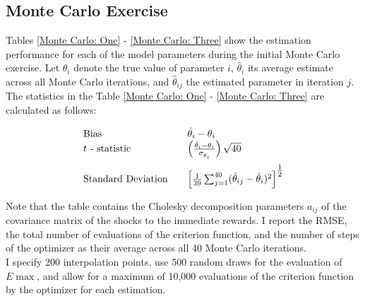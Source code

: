 \subsection{Monte Carlo Exercise}
Tables \ref{Monte Carlo: One} - \ref{Monte Carlo: Three} show the estimation performance for each of the model parameters during the initial Monte Carlo exercise. Let $\theta_i$ denote the true value of parameter $i$, $\hat{\theta}_i$ its average estimate across all Monte Carlo iterations, and $\hat{\theta}_{ij}$ the estimated parameter in iteration $j$. The statistics in the Table \ref{Monte Carlo: One} - \ref{Monte Carlo: Three} are calculated as follows:

\renewcommand\arraystretch{2}
\begin{align*}\begin{array}{l@{\qquad}l}
\text{Bias} & \hat{\theta}_i - \theta_i\\\medskip
\text{$t$ - statistic} & \left(\frac{\hat{\theta}_i - \theta_i}{\sigma_{\hat{\theta_i}}}\right) \sqrt{40} \\
\text{Standard Deviation} & \left[ \frac{1}{39} \sum^{40}_{j = 1} (\hat{\theta}_{ij} - \hat{\theta}_i)^2
\right]^{\tfrac{1}{2}}
\end{array}
\end{align*}
\renewcommand\arraystretch{1}

Note that the table contains the Cholesky decomposition parameters $a_{ij}$ of the covariance matrix of the shocks to the immediate rewards. I report the RMSE, the total number of evaluations of the criterion function, and the number of steps of the optimizer as their average across all 40 Monte Carlo iterations.\\\newline
%
I specify 200 interpolation points, use 500 random draws for the evaluation of $E\max$, and allow for a maximum of 10,000 evaluations of the criterion function by the optimizer for each estimation.\clearpage



\clearpage
